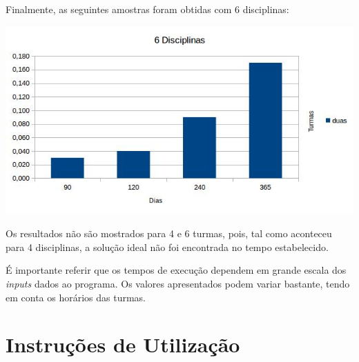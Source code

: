 \documentclass{llncs}
\begin{document}
\newpage
Finalmente, as seguintes amostras foram obtidas com 6 disciplinas:

\includegraphics[scale=0.85]{images/chart3.jpg}

Os resultados não são mostrados para 4 e 6 turmas, pois, tal como aconteceu para 4 disciplinas, a solução ideal não foi encontrada no tempo estabelecido.\par

É importante referir que os tempos de execução dependem em grande escala dos \textit{inputs} dados ao programa. Os valores apresentados podem variar bastante, tendo em conta os horários das turmas.

\section{Instruções de Utilização}
\end{document}
